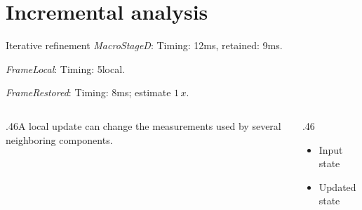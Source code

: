 \documentclass[9pt,aspectratio=43]{beamer}
\newcommand{\fuzzlayerA}[1]{\textit{#1}}
\newcommand{\fuzzlayerB}[1]{\fuzzlayerA{#1}}
\newcommand{\fuzzlayerC}[1]{\fuzzlayerB{#1}}
\newcommand{\fuzzterm}[1]{\fuzzlayerC{#1}}
\newcommand{\fuzzpair}[2]{\fuzzterm{#1}: #2}
\newcommand{\fuzzunit}{ms}
\let\fuzzoriginalunit\fuzzunit
\newcommand{\fuzzcoefficient}{1}
\newcommand{\fuzzscale}[2][\fuzzcoefficient]{#1\,#2}
\begin{document}
\section{Incremental analysis}
\begin{frame}[t]{Iterative refinement}
\fuzzpair{MacroStageD}{Timing: 12\fuzzunit, retained: 9\fuzzoriginalunit.}\par
{\renewcommand{\fuzzunit}{local}\fuzzpair{FrameLocal}{Timing: 5\fuzzunit.}\par}
\fuzzpair{FrameRestored}{Timing: 8\fuzzunit; estimate $\fuzzscale{x}$.}\par
\begin{columns}[T]\begin{column}{.46\textwidth}A local update can change the measurements used by several neighboring components.\end{column}\begin{column}{.46\textwidth}\begin{itemize}\item Input state\item Updated state\end{itemize}\end{column}\end{columns}
\end{frame}
\end{document}
